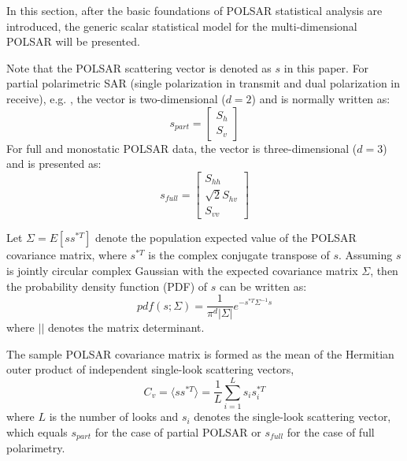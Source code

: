 \documentclass[journal]{IEEEtran}
\begin{document}
In this section, after the basic foundations of POLSAR statistical analysis are introduced,
  the generic scalar statistical model for the multi-dimensional POLSAR will be presented.

Note that the POLSAR scattering vector is denoted as $s$ in this paper.
For partial polarimetric SAR (single polarization in transmit and dual polarization in receive), e.g. \cite{Souyris_2005_TGRS, Raney_2006_IGARSS}, 
  the vector is two-dimensional ($d=2$) and is normally written as: 
\begin{equation}
s_{part}=\begin{bmatrix}
S_h\\ 
S_v
\end{bmatrix}
\end{equation}
For full and monostatic POLSAR data,
  the vector is three-dimensional ($d=3$) and is presented as:
\begin{equation}
s_{full}=\begin{bmatrix}
S_{hh}\\
\sqrt{2}S_{hv}\\
S_{vv}
\end{bmatrix}
\end{equation}

Let $\Sigma=E [ss^{*T}]$ denote the population expected value of the POLSAR covariance matrix,
  where $s^{*T}$ is the complex conjugate transpose of $s$. 
Assuming %
  $s$ is jointly circular complex Gaussian with the expected covariance matrix $\Sigma$,
  then the probability density function (PDF) of $s$ can be written as:
\begin{equation}
  pdf(s;\Sigma)=\frac{1}{\pi^d|\Sigma|} e^{-s^{*T}\Sigma^{-1}s}
\end{equation}
where $||$ denotes the matrix determinant.

The sample POLSAR covariance matrix is formed as the mean of the Hermitian outer product of independent single-look scattering vectors,
\begin{equation}
  C_v = \langle ss^{*T} \rangle = \frac{1}{L} \sum^L_{i=1}s_is_i^{*T}
\end{equation}
where $L$ is the number of looks
  and $s_i$ denotes the single-look scattering vector,
  which equals $s_{part}$ for the case of partial POLSAR or
  $s_{full}$ for the case of full polarimetry.
\end{document}

